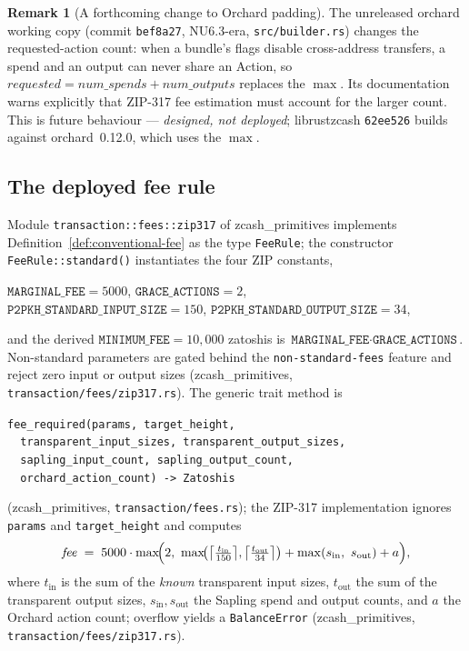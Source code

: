 \documentclass[11pt,a4paper]{article}
\theoremstyle{definition}
\newtheorem{remark}[theorem]{Remark}
\begin{document}
\begin{remark}[A forthcoming change to Orchard padding]%
\label{rem:orchard-padding-future}
The unreleased \textsf{orchard} working copy (commit \texttt{bef8a27},
NU6.3-era, \texttt{src/builder.rs}) changes the requested-action count:
when a bundle's flags disable cross-address transfers, a spend and an
output can never share an Action, so
$\mathit{requested} = \mathit{num\_spends} + \mathit{num\_outputs}$
replaces the $\max$. Its documentation warns explicitly that ZIP-317 fee
estimation must account for the larger count. This is future behaviour ---
\emph{designed, not deployed}; \textsf{librustzcash} \texttt{62ee526}
builds against \textsf{orchard}~0.12.0, which uses the $\max$.
\end{remark}

\subsection{The deployed fee rule}\label{sec:fees-librustzcash}

Module \texttt{transaction::fees::zip317} of \textsf{zcash\_primitives}
implements Definition~\ref{def:conventional-fee} as the type
\texttt{FeeRule}; the constructor \texttt{FeeRule::standard()}
instantiates the four ZIP constants,
\begin{center}
$\texttt{MARGINAL\_FEE} = 5000$, \quad
$\texttt{GRACE\_ACTIONS} = 2$,\\[2pt]
$\texttt{P2PKH\_STANDARD\_INPUT\_SIZE} = 150$, \quad
$\texttt{P2PKH\_STANDARD\_OUTPUT\_SIZE} = 34$,
\end{center}
and the derived $\texttt{MINIMUM\_FEE} = 10{,}000$ zatoshis is
$\texttt{MARGINAL\_FEE} \cdot \texttt{GRACE\_ACTIONS}$. Non-standard
parameters are gated behind the \texttt{non-standard-fees} feature and
reject zero input or output sizes (\textsf{zcash\_primitives},
\texttt{transaction/fees/zip317.rs}). The generic trait method is
\begin{center}
\texttt{fee\_required(params, target\_height,}\\
\texttt{\ \ transparent\_input\_sizes, transparent\_output\_sizes,}\\
\texttt{\ \ sapling\_input\_count, sapling\_output\_count,}\\
\texttt{\ \ orchard\_action\_count) -> Zatoshis}
\end{center}
(\textsf{zcash\_primitives}, \texttt{transaction/fees.rs}); the ZIP-317
implementation ignores \texttt{params} and \texttt{target\_height} and
computes
\[
\mathit{fee} \;=\; 5000 \cdot \max\!\Bigl(2,\
\max\!\bigl(\bigl\lceil \tfrac{t_{\mathrm{in}}}{150} \bigr\rceil,
\bigl\lceil \tfrac{t_{\mathrm{out}}}{34} \bigr\rceil\bigr)
+ \max(s_{\mathrm{in}},\ s_{\mathrm{out}}) + a\Bigr),
\]
where $t_{\mathrm{in}}$ is the sum of the \emph{known} transparent input
sizes, $t_{\mathrm{out}}$ the sum of the transparent output sizes,
$s_{\mathrm{in}}, s_{\mathrm{out}}$ the Sapling spend and output counts,
and $a$ the Orchard action count; overflow yields a \texttt{BalanceError}
(\textsf{zcash\_primitives}, \texttt{transaction/fees/zip317.rs}).
\end{document}
